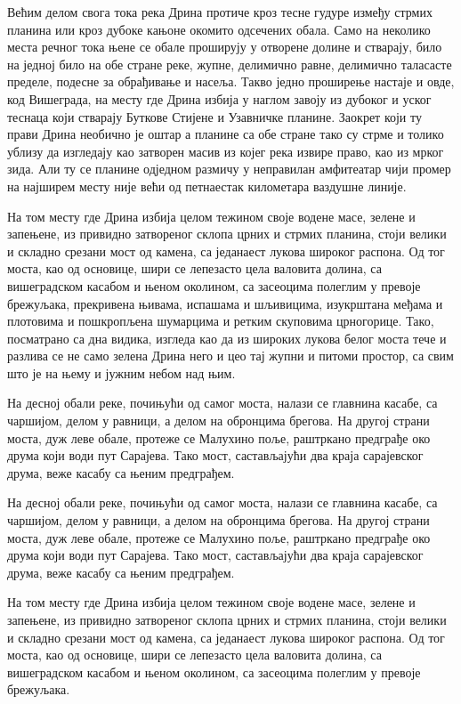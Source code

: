 \documentclass{UUThesisTemplate}
\begin{document}
\begin{serbian}
{\par
Већим делом свога тока река Дрина протиче кроз тесне гудуре између стрмих планина или кроз дубоке кањоне окомито одсечених обала. Само на неколико места речног тока њене се обале проширују у отворене долине и стварају, било на једној било на обе стране реке, жупне, делимично равне, делимично таласасте пределе, подесне за обрађивање и насеља. Такво једно проширење настаје и овде, код Вишеграда, на месту где Дрина избија у наглом завоју из дубоког и уског теснаца који стварају Буткове Стијене и Узавничке планине. Заокрет који ту прави Дрина необично је оштар а планине са обе стране тако су стрме и толико ублизу да изгледају као затворен масив из којег река извире право, као из мрког зида. Али ту се планине одједном размичу у неправилан амфитеатар чији промер на најширем месту није већи од петнаестак километара ваздушне линије.

\par
На том месту где Дрина избија целом тежином своје водене масе, зелене и запењене, из привидно затвореног склопа црних и стрмих планина, стоји велики и складно срезани мост од камена, са једанаест лукова широког распона. Од тог моста, као од основице, шири се лепезасто цела валовита долина, са вишеградском касабом и њеном околином, са засеоцима полеглим у превоје брежуљака, прекривена њивама, испашама и шљивицима, изукрштана међама и плотовима и пошкропљена шумарцима и ретким скуповима црногорице. Тако, посматрано са дна видика, изгледа као да из широких лукова белог моста тече и разлива се не само зелена Дрина него и цео тај жупни и питоми простор, са свим што је на њему и јужним небом над њим.

\par
На десној обали реке, почињући од самог моста, налази се главнина касабе, са чаршијом, делом у равници, а делом на обронцима брегова. На другој страни моста, дуж леве обале, протеже се Малухино поље, раштркано предграђе око друма који води пут Сарајева. Тако мост, састављајући два краја сарајевског друма, веже касабу са њеним предграђем.

\par
На десној обали реке, почињући од самог моста, налази се главнина касабе, са чаршијом, делом у равници, а делом на обронцима брегова. На другој страни моста, дуж леве обале, протеже се Малухино поље, раштркано предграђе око друма који води пут Сарајева. Тако мост, састављајући два краја сарајевског друма, веже касабу са њеним предграђем.

\par
На том месту где Дрина избија целом тежином своје водене масе, зелене и запењене, из привидно затвореног склопа црних и стрмих планина, стоји велики и складно срезани мост од камена, са једанаест лукова широког распона. Од тог моста, као од основице, шири се лепезасто цела валовита долина, са вишеградском касабом и њеном околином, са засеоцима полеглим у превоје брежуљака.
}
\end{serbian}
\end{document}
